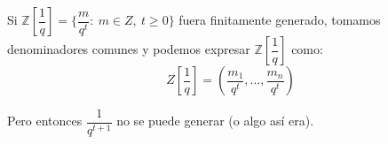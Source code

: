 \documentclass[openany]{book}
\begin{document}
\setcounter{ex}{11}

\begin{exercise}
    $ $

    Si $ \mathbb{Z}[\dfrac{1}{q}] = \{\dfrac{m}{q^{t}}:\ m \in Z,\ t\geq 0\}$ fuera finitamente generado, tomamos denominadores comunes y podemos expresar $ \mathbb{Z}[\dfrac{1}{q}]$ como:
    $$ Z[\dfrac{1}{q}] = \left( \dfrac{m_1}{q^{t}},..., \dfrac{m_n}{q^{t}} \right) $$ 

    Pero entonces $ \dfrac{1}{q^{t+1}}$ no se puede generar (o algo así era).
\end{exercise}
\end{document}
